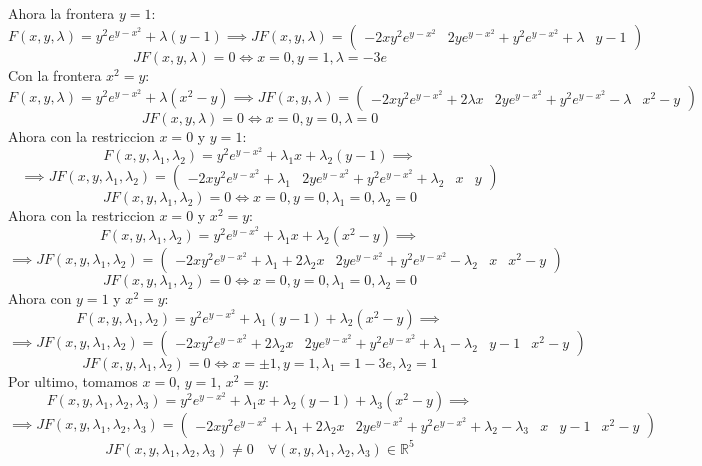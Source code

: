 \documentclass{article}
\begin{document}
Ahora la frontera $y = 1$:
\[
F(x, y, \lambda) = y^2e^{y-x^2} + \lambda (y-1)
\implies
JF(x, y, \lambda) =
\begin{pmatrix} -2xy^2e^{y-x^2} & 2ye^{y-x^2} + y^2e^{y-x^2} + \lambda & y - 1 \end{pmatrix}
\]
\[
JF(x, y, \lambda) = 0 \iff x = 0, y = 1, \lambda = -3e
\]
Con la frontera $x^2 = y$:
\[
F(x, y, \lambda) = y^2e^{y-x^2} + \lambda (x^2 - y)
\implies
JF(x, y, \lambda) =
\begin{pmatrix} -2xy^2e^{y-x^2} + 2\lambda x & 2ye^{y-x^2} + y^2e^{y-x^2} - \lambda &
x^2 - y \end{pmatrix}
\]
\[
JF(x, y, \lambda) = 0 \iff x = 0, y = 0, \lambda = 0
\]
\newpage
Ahora con la restriccion $x=0$ y $y=1$:
\[
F(x, y, \lambda_1, \lambda_2) = y^2e^{y-x^2} + \lambda_1 x + \lambda_2 (y-1) \implies
\]
\[
\implies JF(x, y, \lambda_1, \lambda_2) = 
\begin{pmatrix}
-2xy^2e^{y-x^2} + \lambda_1 & 2ye^{y-x^2} + y^2e^{y-x^2} + \lambda_2 & x & y
\end{pmatrix}
\]
\[
JF(x, y, \lambda_1, \lambda_2) = 0 \iff x=0,y=0,\lambda_1=0,\lambda_2=0
\]
Ahora con la restriccion $x=0$ y $x^2=y$:
\[
F(x, y, \lambda_1, \lambda_2) = y^2e^{y-x^2} + \lambda_1 x + \lambda_2 (x^2 - y) \implies
\]
\[
\implies JF(x, y, \lambda_1, \lambda_2) = 
\begin{pmatrix}
-2xy^2e^{y-x^2} + \lambda_1 + 2\lambda_2x & 2ye^{y-x^2} + y^2e^{y-x^2} - \lambda_2 & x & x^2 - y
\end{pmatrix}
\]
\[
JF(x, y, \lambda_1, \lambda_2) = 0 \iff x=0,y=0,\lambda_1=0,\lambda_2=0
\]
Ahora con $y=1$ y $x^2=y$:
\[
F(x, y, \lambda_1, \lambda_2) = y^2e^{y-x^2} + \lambda_1 (y-1) + \lambda_2 (x^2 - y) \implies
\]
\[
\implies JF(x, y, \lambda_1, \lambda_2) = 
\begin{pmatrix}
-2xy^2e^{y-x^2} + 2\lambda_2x & 2ye^{y-x^2} + y^2e^{y-x^2} +\lambda_1 - \lambda_2 & y-1 & x^2 - y
\end{pmatrix}
\]
\[
JF(x, y, \lambda_1, \lambda_2) = 0 \iff x=\pm 1, y =1, \lambda_1 = 1-3e, \lambda_2=1
\]
Por ultimo, tomamos $x=0$, $y=1$, $x^2=y$:
\[
F(x, y, \lambda_1, \lambda_2, \lambda_3) = y^2e^{y-x^2} + \lambda_1 x + \lambda_2 (y-1) +
\lambda_3 (x^2 - y) \implies
\]
\[
\implies JF(x, y, \lambda_1, \lambda_2, \lambda_3) = 
\begin{pmatrix}
-2xy^2e^{y-x^2} + \lambda_1 + 2\lambda_2 x & 2ye^{y-x^2} + y^2e^{y-x^2} + \lambda_2 - \lambda_3
& x & y-1 & x^2 - y
\end{pmatrix}
\]
\[
JF(x, y, \lambda_1, \lambda_2, \lambda_3) \neq 0 \quad
\forall (x, y, \lambda_1, \lambda_2, \lambda_3) \in \mathbb{R}^5
\]
\end{document}

